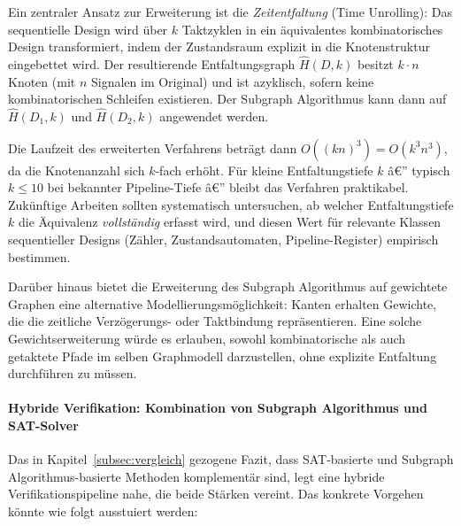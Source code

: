﻿\documentclass[12pt,a4paper]{report}
\begin{document}
Ein zentraler Ansatz zur Erweiterung ist die \emph{Zeitentfaltung} (Time Unrolling):
Das sequentielle Design wird über $k$ Taktzyklen in ein äquivalentes kombinatorisches
Design transformiert, indem der Zustandsraum explizit in die Knotenstruktur eingebettet
wird. Der resultierende Entfaltungsgraph $\hat{H}(D, k)$ besitzt $k \cdot n$ Knoten (mit
$n$ Signalen im Original) und ist azyklisch, sofern keine kombinatorischen Schleifen
existieren. Der Subgraph Algorithmus kann dann auf $\hat{H}(D_1, k)$ und $\hat{H}(D_2, k)$
angewendet werden.

Die Laufzeit des erweiterten Verfahrens beträgt dann $O((kn)^3) = O(k^3 n^3)$, da die
Knotenanzahl sich $k$-fach erhöht. Für kleine Entfaltungstiefe $k$ â€” typisch $k \leq 10$
bei bekannter Pipeline-Tiefe â€” bleibt das Verfahren praktikabel. Zukünftige Arbeiten
sollten systematisch untersuchen, ab welcher Entfaltungstiefe $k$ die Äquivalenz
\emph{vollständig} erfasst wird, und diesen Wert für relevante Klassen sequentieller
Designs (Zähler, Zustandsautomaten, Pipeline-Register) empirisch bestimmen.

Darüber hinaus bietet die Erweiterung des Subgraph Algorithmus auf gewichtete Graphen
eine alternative Modellierungsmöglichkeit: Kanten erhalten Gewichte, die die zeitliche
Verzögerungs- oder Taktbindung repräsentieren. Eine solche Gewichtserweiterung würde es
erlauben, sowohl kombinatorische als auch getaktete Pfade im selben Graphmodell
darzustellen, ohne explizite Entfaltung durchführen zu müssen.

\paragraph{Hybride Verifikation: Kombination von Subgraph Algorithmus und SAT-Solver}

Das in Kapitel~\ref{subsec:vergleich} gezogene Fazit, dass SAT-basierte und
Subgraph Algorithmus-basierte Methoden komplementär sind, legt eine hybride
Verifikationspipeline nahe, die beide Stärken vereint. Das konkrete Vorgehen könnte
wie folgt ausstuiert werden:
\end{document}
